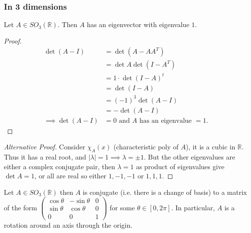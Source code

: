 \subsubsection{In 3 dimensions}
\begin{proposition}\label{prp:11}
    Let $A \in SO_3(\mathbb{R})$.
    Then $A$ has an eigenvector with eigenvalue $1$.
\end{proposition} 

\begin{proof}
    \begin{align*}
        \det (A - I) &= \det  (A - A A^T) \\
        &= \det A \det (I - A^T) \\
        &= 1 \cdot \det (I - A)^t \\
        &= \det (I - A) \\
        &= (-1)^3 \det (A - I) \\
        &= - \det (A - I) \\
        \implies \det (A - I) &= 0 \text{ and $A$ has an eigenvalue $= 1$}.
    \end{align*} 
\end{proof} 

\begin{proof}[Alternative Proof]
    Consider $\chi_A(x)$ (characteristic poly of $A$), it is a cubic in $\mathbb{R}$.
    Thus it has a real root, and $|\lambda| = 1 \implies \lambda = \pm 1$. 
    But the other eigenvalues are either a complex conjugate pair, then $\lambda = 1$ as product of eigenvalues give $\det A = 1$, or all are real so either $1, -1, -1$ or $1, 1, 1$.
\end{proof} 

\begin{theorem} \label{thm:11}
    Let $A \in SO_3(\mathbb{R})$ then $A$ is conjugate (i.e. there is a change of basis) to a matrix of the form $\begin{pmatrix}
    \cos \theta & -\sin \theta & 0 \\
    \sin \theta & \cos \theta & 0 \\
    0 & 0 & 1
    \end{pmatrix}$ for some $\theta \in [0, 2 \pi]$.
    In particular, $A$ is a rotation around an axis through the origin.
\end{theorem} 

